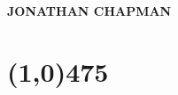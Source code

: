\documentclass{res}  %
\begin{document}
 

\begin{center}
	\Large
	\textbf{JONATHAN CHAPMAN}
	\vspace{-8mm}
\end{center}
\section{\line(1,0){475}} %


\address{University of Bologna \\ Department of Economics \\ Bologna, Italy \\
\href{http://www.jnchapman.com}{http://www.jnchapman.com}}
\address{ Updated: \today 
	\\  \href{mailto:jonathan.chapman@unibo.it}{jonathan.chapman@unibo.it} }
\pagestyle{fancy}
\end{document}
